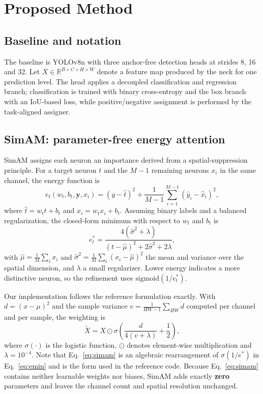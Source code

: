 \documentclass[pdflatex,sn-basic,Numbered]{sn-jnl}%
\begin{document}
\section{Proposed Method}\label{sec:method}

\subsection{Baseline and notation}

The baseline is YOLOv8n with three anchor-free detection heads at strides 8, 16 and 32. Let $X\in\mathbb{R}^{B\times C\times H\times W}$ denote a feature map produced by the neck for one prediction level. The head applies a decoupled classification and regression branch; classification is trained with binary cross-entropy and the box branch with an IoU-based loss, while positive/negative assignment is performed by the task-aligned assigner.

\subsection{SimAM: parameter-free energy attention}\label{sec:simam}

SimAM assigns each neuron an importance derived from a spatial-suppression principle. For a target neuron $t$ and the $M-1$ remaining neurons $x_i$ in the same channel, the energy function is
\begin{equation}
e_t(w_t,b_t,\mathbf{y},x_i) = \left(y-\hat{t}\right)^2 + \frac{1}{M-1}\sum_{i=1}^{M-1}\left(\hat{y}_i-\hat{x}_i\right)^2,
\label{eq:energy}
\end{equation}
where $\hat{t}=w_t t+b_t$ and $\hat{x}_i = w_t x_i + b_t$. Assuming binary labels and a balanced regularization, the closed-form minimum with respect to $w_t$ and $b_t$ is
\begin{equation}
e_t^{*} = \frac{4\left(\hat{\sigma}^2+\lambda\right)}{\left(t-\hat{\mu}\right)^2 + 2\hat{\sigma}^2 + 2\lambda},
\label{eq:emin}
\end{equation}
with $\hat{\mu}=\frac{1}{M}\sum_i x_i$ and $\hat{\sigma}^2=\frac{1}{M}\sum_i (x_i-\hat{\mu})^2$ the mean and variance over the spatial dimension, and $\lambda$ a small regularizer. Lower energy indicates a more distinctive neuron, so the refinement uses $\mathrm{sigmoid}(1/e_t^{*})$.

Our implementation follows the reference formulation exactly. With $d=(x-\mu)^2$ and the sample variance $v=\frac{1}{HW-1}\sum_{HW} d$ computed per channel and per sample, the weighting is
\begin{equation}
\tilde{X} = X \odot \sigma\!\left(\frac{d}{4\left(v+\lambda\right)} + \frac{1}{2}\right),
\label{eq:simam}
\end{equation}
where $\sigma(\cdot)$ is the logistic function, $\odot$ denotes element-wise multiplication and $\lambda = 10^{-4}$. Note that Eq.~\eqref{eq:simam} is an algebraic rearrangement of $\sigma(1/e^{*})$ in Eq.~\eqref{eq:emin} and is the form used in the reference code. Because Eq.~\eqref{eq:simam} contains neither learnable weights nor biases, SimAM adds exactly \textbf{zero} parameters and leaves the channel count and spatial resolution unchanged.
\end{document}
